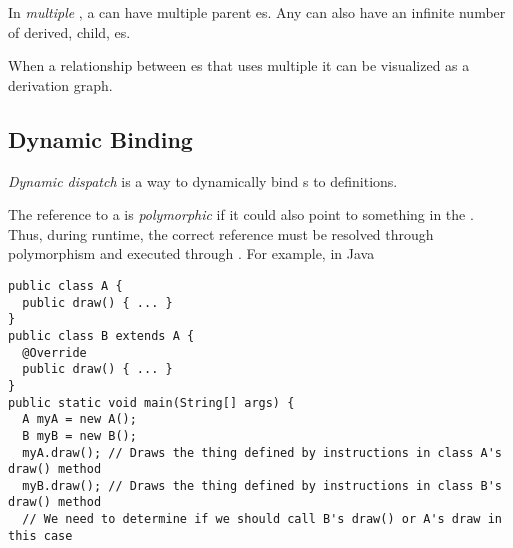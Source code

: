 \begin{definition}\label{def:OOP_Multiple_Inheritance}
  In \emph{multiple }, a  can have multiple parent es.
  Any  can also have an infinite number of derived, child, es.

  When a relationship between es that uses multiple  it can be visualized as a derivation graph.
\end{definition}

\subsection{Dynamic Binding}\label{subsec:OOP_Dynamic_Binding}
\begin{definition}\label{def:OOP_Dynamic_Dispatch}
  \emph{Dynamic dispatch} is a way to dynamically bind s to  definitions.
\end{definition}

\begin{definition}[Polymorphic]\label{def:OOP_Polymorphic}
  The reference to a  is \emph{polymorphic} if it could also point to something in the .
  Thus, during runtime, the correct reference must be resolved through polymorphism and executed through .
  For example, in Java
\begin{verbatim}
public class A {
  public draw() { ... }
}
public class B extends A {
  @Override
  public draw() { ... }
}
public static void main(String[] args) {
  A myA = new A();
  B myB = new B();
  myA.draw(); // Draws the thing defined by instructions in class A's draw() method
  myB.draw(); // Draws the thing defined by instructions in class B's draw() method
  // We need to determine if we should call B's draw() or A's draw in this case
\end{verbatim}
\end{definition}

\begin{definition}\label{def:OOP_Abstract_Method}
  
\end{definition}

\begin{definition}\label{def:OOP_Abstract_Class}
  
\end{definition}

